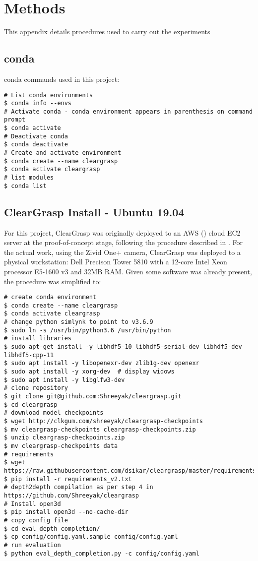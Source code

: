 \chapter{Methods} %
\label{Appendix-methods} 

This appendix details procedures used to carry out the experiments

\section{conda}
\label{app:methods:Conda}

conda commands used in this project:

\begin{verbatim}
# List conda environments
$ conda info --envs
# Activate conda - conda environment appears in parenthesis on command prompt
$ conda activate
# Deactivate conda
$ conda deactivate
# Create and activate environment
$ conda create --name cleargrasp
$ conda activate cleargrasp
# list modules
$ conda list
\end{verbatim}

\section{ClearGrasp Install - Ubuntu 19.04}

For this project, ClearGrasp was originally deployed to an AWS (\cite{amazon2015amazon}) cloud EC2 server at the proof-of-concept stage, following the procedure described in \cite{cleargrasp-install2020}. For the actual work, using the Zivid One+ camera, ClearGrasp was deployed to a physical workstation: Dell Precison Tower 5810 with a 12-core Intel Xeon processor E5-1600 v3 and 32MB RAM. Given some software was already present, the procedure was simplified to:
\begin{verbatim}
# create conda environment
$ conda create --name cleargrasp
$ conda activate cleargrasp
# change python simlynk to point to v3.6.9
$ sudo ln -s /usr/bin/python3.6 /usr/bin/python
# install libraries
$ sudo apt-get install -y libhdf5-10 libhdf5-serial-dev libhdf5-dev libhdf5-cpp-11
$ sudo apt install -y libopenexr-dev zlib1g-dev openexr
$ sudo apt install -y xorg-dev  # display widows
$ sudo apt install -y libglfw3-dev
# clone repository
$ git clone git@github.com:Shreeyak/cleargrasp.git
$ cd cleargrasp
# download model checkpoints
$ wget http://clkgum.com/shreeyak/cleargrasp-checkpoints 
$ mv cleargrasp-checkpoints cleargrasp-checkpoints.zip
$ unzip cleargrasp-checkpoints.zip
$ mv cleargrasp-checkpoints data
# requirements
$ wget https://raw.githubusercontent.com/dsikar/cleargrasp/master/requirements_v2.txt
$ pip install -r requirements_v2.txt
# depth2depth compilation as per step 4 in https://github.com/Shreeyak/cleargrasp
# Install open3d
$ pip install open3d --no-cache-dir
# copy config file
$ cd eval_depth_completion/
$ cp config/config.yaml.sample config/config.yaml
# run evaluation
$ python eval_depth_completion.py -c config/config.yaml
\end{verbatim}


